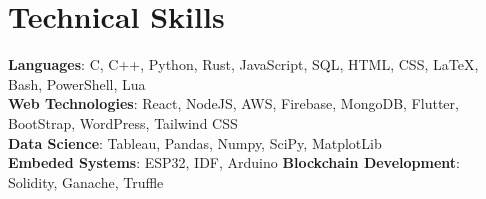 \documentclass[letterpaper,11pt]{article}
\begin{document}
\section{Technical Skills}
\begin{itemize}[leftmargin=0.15in, label={}]
  \small{\item{
                \textbf{Languages}{: C, C++, Python, Rust, JavaScript, SQL, HTML, CSS, {\LaTeX}, Bash, PowerShell, Lua} \\
                \textbf{Web Technologies}{: React, NodeJS, AWS, Firebase, MongoDB, Flutter, BootStrap, WordPress, Tailwind CSS} \\
                \textbf{Data Science}{: Tableau, Pandas, Numpy, SciPy, MatplotLib} \\
                \textbf{Embeded Systems}{: ESP32, IDF, Arduino}
                \hspace{1em}
                \textbf{Blockchain Development}{: Solidity, Ganache, Truffle} \\
          }}
\end{itemize}
\vspace{-16pt}
\end{document}
